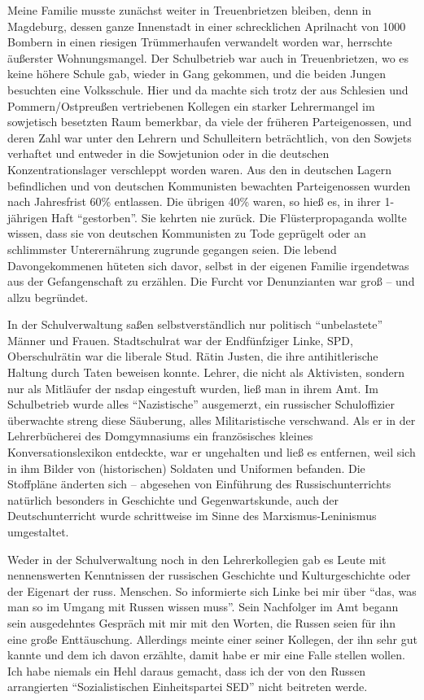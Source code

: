  Meine Familie musste zunächst weiter in Treuenbrietzen bleiben, denn in Magdeburg, dessen ganze Innenstadt in einer schrecklichen Aprilnacht von 1000 Bombern in einen riesigen Trümmerhaufen verwandelt worden war, herrschte äußerster Wohnungsmangel. Der Schulbetrieb war auch in Treuenbrietzen, wo es keine höhere Schule gab, wieder in Gang gekommen, und die beiden Jungen besuchten eine Volksschule. Hier und da machte sich trotz der aus Schlesien und Pommern/Ostpreußen vertriebenen Kollegen ein starker Lehrermangel im sowjetisch besetzten Raum bemerkbar, da viele der früheren Parteigenossen, und deren Zahl war unter den Lehrern und Schulleitern beträchtlich, von den Sowjets verhaftet und entweder in die Sowjetunion oder in die deutschen Konzentrationslager verschleppt worden waren. Aus den in deutschen Lagern befindlichen und von deutschen Kommunisten bewachten Parteigenossen wurden nach Jahresfrist 60\% entlassen. Die übrigen 40\% waren, so hieß es, in ihrer 1-jährigen Haft \enquote{gestorben}. Sie kehrten nie zurück. Die Flüsterpropaganda wollte wissen, dass sie von deutschen Kommunisten zu Tode geprügelt oder an schlimmster Unterernährung zugrunde gegangen seien. Die lebend Davongekommenen hüteten sich davor, selbst in der eigenen Familie irgendetwas aus der Gefangenschaft zu erzählen. Die Furcht vor Denunzianten war groß -- und allzu begründet.

In der Schulverwaltung saßen selbstverständlich nur politisch \enquote{unbelastete} Männer und Frauen. Stadtschulrat war der Endfünfziger Linke, SPD, Oberschulrätin war die liberale Stud. Rätin Justen, die ihre antihitlerische Haltung durch Taten beweisen konnte. Lehrer, die nicht als Aktivisten, sondern nur als Mitläufer der \ac{nsdap} eingestuft wurden, ließ man in ihrem Amt. Im Schulbetrieb wurde alles \enquote{Nazistische} ausgemerzt, ein russischer Schuloffizier überwachte streng diese Säuberung, alles Militaristische verschwand. Als er in der Lehrerbücherei des Domgymnasiums ein französisches kleines Konversationslexikon entdeckte, war er ungehalten und ließ es entfernen, weil sich in ihm Bilder von (historischen) Soldaten und Uniformen befanden. Die Stoffpläne änderten sich -- abgesehen von Einführung des Russischunterrichts natürlich besonders in Geschichte und Gegenwartskunde, auch der Deutschunterricht wurde schrittweise im Sinne des Marxismus-Leninismus umgestaltet.

Weder in der Schulverwaltung noch in den Lehrerkollegien gab es Leute mit nennenswerten Kenntnissen der russischen Geschichte und Kulturgeschichte oder der Eigenart der russ. Menschen. So informierte sich Linke bei mir über \enquote{das, was man so im Umgang mit Russen wissen muss}. Sein Nachfolger im Amt begann sein ausgedehntes Gespräch mit mir mit den Worten, die Russen seien für ihn eine große Enttäuschung. Allerdings meinte einer seiner Kollegen, der ihn sehr gut kannte und dem ich davon erzählte, damit habe er mir eine Falle stellen wollen. Ich habe niemals ein Hehl daraus gemacht, dass ich der von den Russen arrangierten \enquote{Sozialistischen Einheitspartei SED} nicht beitreten werde.

